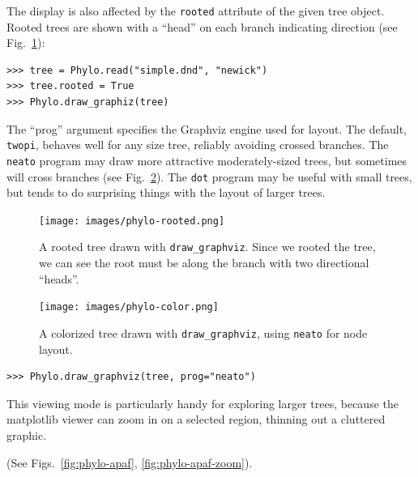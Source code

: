 \documentclass{report}
\begin{document}
The display is also affected by the \verb|rooted| attribute of the given tree object.
Rooted trees are shown with a ``head'' on each branch indicating direction (see
Fig.~\ref{fig:phylo-rooted}):

\begin{verbatim}
>>> tree = Phylo.read("simple.dnd", "newick")
>>> tree.rooted = True
>>> Phylo.draw_graphiz(tree)
\end{verbatim}

\begin{htmlonly}
\label{fig:phylo-rooted}
\end{htmlonly}

The ``prog'' argument specifies the Graphviz engine used for layout. The default,
\verb|twopi|, behaves well for any size tree, reliably avoiding crossed branches. The
\verb|neato| program may draw more attractive moderately-sized trees, but sometimes will
cross branches (see Fig.~\ref{fig:phylo-color}). The \verb|dot| program may be useful
with small trees, but tends to do surprising things with the layout of larger trees.

\begin{latexonly}
\begin{figure}[ptb]
\centering
\texttt{[image: images/phylo-rooted.png]}
\caption{A rooted tree drawn with {\tt draw\_graphviz}.
Since we rooted the tree, we can see the root must be along the branch with two
directional ``heads''.
}
\label{fig:phylo-rooted}
\end{figure}
\begin{figure}[ptb]
\centering
\texttt{[image: images/phylo-color.png]}
\caption{A colorized tree drawn with {\tt draw\_graphviz}, using {\tt neato} for node layout.}
\label{fig:phylo-color}
\end{figure}
\end{latexonly}

\begin{verbatim}
>>> Phylo.draw_graphviz(tree, prog="neato")
\end{verbatim}

\begin{htmlonly}
\label{fig:phylo-color}
\end{htmlonly}

This viewing mode is particularly handy for exploring larger trees, because the matplotlib
viewer can zoom in on a selected region, thinning out a cluttered graphic.
\begin{latexonly}
(See Figs.~\ref{fig:phylo-apaf}, \ref{fig:phylo-apaf-zoom}).
\end{latexonly}
\end{document}
